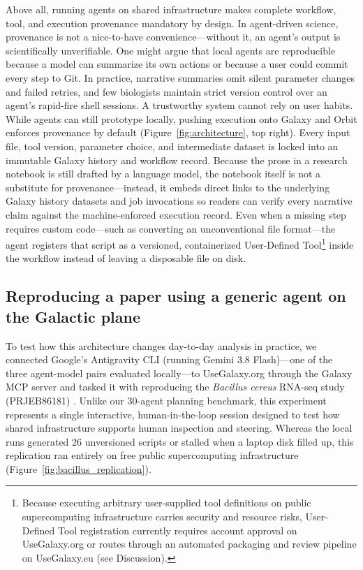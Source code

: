 \documentclass[11pt,letterpaper]{article}
\begin{document}
Above all, running agents on shared infrastructure makes complete workflow, tool, and execution provenance mandatory by design. In agent-driven science, provenance is not a nice-to-have convenience---without it, an agent's output is scientifically unverifiable. One might argue that local agents are reproducible because a model can summarize its own actions or because a user could commit every step to Git. In practice, narrative summaries omit silent parameter changes and failed retries, and few biologists maintain strict version control over an agent's rapid-fire shell sessions. A trustworthy system cannot rely on user habits. While agents can still prototype locally, pushing execution onto Galaxy and Orbit enforces provenance by default (Figure~\ref{fig:architecture}, top right). Every input file, tool version, parameter choice, and intermediate dataset is locked into an immutable Galaxy history and workflow record. Because the prose in a research notebook is still drafted by a language model, the notebook itself is not a substitute for provenance---instead, it embeds direct links to the underlying Galaxy history datasets and job invocations so readers can verify every narrative claim against the machine-enforced execution record. Even when a missing step requires custom code---such as converting an unconventional file format---the agent registers that script as a versioned, containerized User-Defined Tool\footnote{Because executing arbitrary user-supplied tool definitions on public supercomputing infrastructure carries security and resource risks, User-Defined Tool registration currently requires account approval on UseGalaxy.org or routes through an automated packaging and review pipeline on UseGalaxy.eu (see Discussion).} inside the workflow instead of leaving a disposable file on disk.

\subsection{Reproducing a paper using a generic agent on the Galactic plane}

To test how this architecture changes day-to-day analysis in practice, we connected Google's Antigravity CLI (running Gemini 3.8 Flash)---one of the three agent-model pairs evaluated locally---to UseGalaxy.org through the Galaxy MCP server \cite{galaxymcp2026} and tasked it with reproducing the \textit{Bacillus cereus} RNA-seq study (PRJEB86181) \cite{vyklicka2026}. Unlike our 30-agent planning benchmark, this experiment represents a single interactive, human-in-the-loop session designed to test how shared infrastructure supports human inspection and steering. Whereas the local runs generated 26 unversioned scripts or stalled when a laptop disk filled up, this replication ran entirely on free public supercomputing infrastructure (Figure~\ref{fig:bacillus_replication}).
\end{document}
